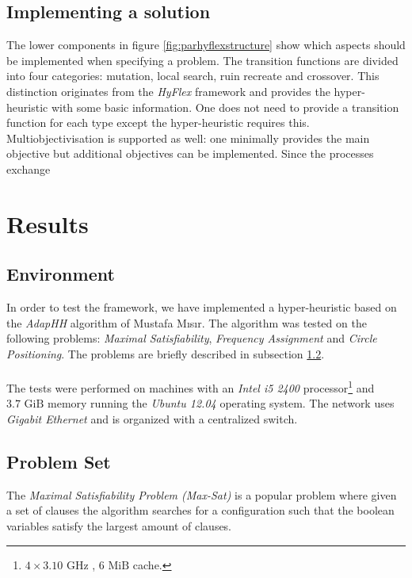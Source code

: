 \documentclass[a4paper,10pt]{article}
\newcommand{\seclab}[1]{\label{sec:#1}}
\newcommand{\ssclab}[1]{\label{ssc:#1}}
\newcommand{\sscref}[1]{\ref{ssc:#1}}
\theoremstyle{definition}
\begin{document}
\subsection{Implementing a solution}
The lower components in figure \ref{fig:parhyflexstructure} show which aspects should be implemented when specifying a problem. The transition functions are divided into four categories: mutation, local search, ruin recreate and crossover. This distinction originates from the \emph{HyFlex} framework and provides the hyper-heuristic with some basic information. One does not need to provide a transition function for each type except the hyper-heuristic requires this. Multiobjectivisation is supported as well: one minimally provides the main objective but additional objectives can be implemented. Since the processes exchange 

\section{Results}
\seclab{results}

\subsection{Environment}
In order to test the framework, we have implemented a hyper-heuristic based on the \emph{AdapHH}\cite{} algorithm of Mustafa M\i{}s\i{}r. The algorithm was tested on the following problems: \emph{Maximal Satisfiability}, \emph{Frequency Assignment} and \emph{Circle Positioning}. The problems are briefly described in subsection \sscref{problemset}.%
\paragraph{}
The tests were performed on machines with an \emph{Intel i5 2400} processor\footnote{$4\times 3.10\mbox{ GHz}$ , $6\mbox{ MiB}$ cache.} and $3.7\mbox{ GiB}$ memory running the \emph{Ubuntu 12.04} operating system. The network uses \emph{Gigabit Ethernet} and is organized with a centralized switch.

\subsection{Problem Set}
\ssclab{problemset}
The \emph{Maximal Satisfiability Problem (Max-Sat)}\cite{} is a popular problem where given a set of clauses the algorithm searches for a configuration such that the boolean variables satisfy the largest amount of clauses.
\end{document}
